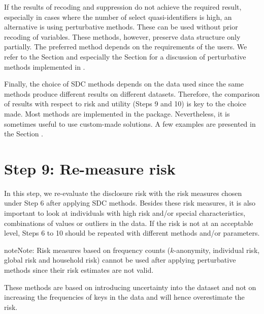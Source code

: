 \documentclass[letterpaper,10pt,english]{sphinxmanual}
\begin{document}
If the results of recoding and suppression do not achieve the required
result, especially in cases where the number of select quasi-identifiers
is high, an alternative is using perturbative methods. These can be used
without prior recoding of variables. These methods, however, preserve
data structure only partially. The preferred method depends on the
requirements of the users. We refer to the Section
 and especially the Section
for a discussion of perturbative methods implemented in .

Finally, the choice of SDC methods depends on the data used since the
same methods produce different results on different datasets. Therefore,
the comparison of results with respect to risk and utility
(Steps 9 and 10) is key to the choice made. Most methods are implemented in the
 package. Nevertheless, it is sometimes useful to use
custom-made solutions. A few examples are presented in the Section
.


\section{Step 9: Re-measure risk}
\label{\detokenize{process:step-9-re-measure-risk}}
In this step, we re-evaluate the disclosure risk with the risk measures
chosen under Step 6 after applying SDC methods. Besides these risk
measures, it is also important to look at individuals with high risk
and/or special characteristics, combinations of values or outliers in
the data. If the risk is not at an acceptable level, Steps 6 to 10
should be repeated with different methods and/or parameters.

\begin{sphinxadmonition}{note}{Note:}
Risk measures based on frequency counts
(\(k\)-anonymity, individual risk, global risk and
household risk) cannot be used after applying perturbative methods since
their risk estimates are not valid.
\end{sphinxadmonition}

These methods are based on
introducing uncertainty into the dataset and not on increasing the
frequencies of keys in the data and will hence overestimate the risk.
\end{document}
